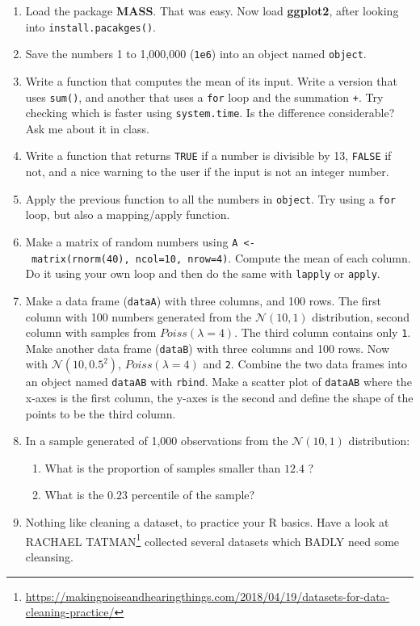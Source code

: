 \documentclass[]{book}
\providecommand{\tightlist}{%
  \setlength{\itemsep}{0pt}\setlength{\parskip}{0pt}}
\renewcommand{\href}[2]{#2\footnote{\url{#1}}}
\theoremstyle{definition}
\theoremstyle{definition}
\theoremstyle{definition}
\theoremstyle{remark}
\begin{document}
\begin{enumerate}
\def\labelenumi{\arabic{enumi}.}
\item
  Load the package \textbf{MASS}. That was easy. Now load \textbf{ggplot2}, after looking into \texttt{install.pacakges()}.
\item
  Save the numbers 1 to 1,000,000 (\texttt{1e6}) into an object named \texttt{object}.
\item
  Write a function that computes the mean of its input.
  Write a version that uses \texttt{sum()}, and another that uses a \texttt{for} loop and the summation \texttt{+}.
  Try checking which is faster using \texttt{system.time}.
  Is the difference considerable? Ask me about it in class.
\item
  Write a function that returns \texttt{TRUE} if a number is divisible by 13, \texttt{FALSE} if not, and a nice warning to the user if the input is not an integer number.
\item
  Apply the previous function to all the numbers in \texttt{object}. Try using a \texttt{for} loop, but also a mapping/apply function.
\item
  Make a matrix of random numbers using \texttt{A\ \textless{}-\ matrix(rnorm(40),\ ncol=10,\ nrow=4)}.
  Compute the mean of each column.
  Do it using your own loop and then do the same with \texttt{lapply} or \texttt{apply}.
\item
  Make a data frame (\texttt{dataA}) with three columns, and 100 rows.
  The first column with 100 numbers generated from the \(\mathcal{N}(10,1)\) distribution, second column with samples from \(Poiss(\lambda=4)\).
  The third column contains only \texttt{1}.\\
  Make another data frame (\texttt{dataB}) with three columns and 100 rows.
  Now with \(\mathcal{N}(10,0.5^2)\), \(Poiss(\lambda=4)\) and \texttt{2}.
  Combine the two data frames into an object named \texttt{dataAB} with \texttt{rbind}.
  Make a scatter plot of \texttt{dataAB} where the x-axes is the first column, the y-axes is the second and define the shape of the points to be the third column.
\item
  In a sample generated of 1,000 observations from the \(\mathcal{N}(10,1)\) distribution:

  \begin{enumerate}
  \def\labelenumii{\arabic{enumii}.}
  \tightlist
  \item
    What is the proportion of samples smaller than \(12.4\) ?
  \item
    What is the \(0.23\) percentile of the sample?
  \end{enumerate}
\item
  Nothing like cleaning a dataset, to practice your R basics. Have a look at \href{https://makingnoiseandhearingthings.com/2018/04/19/datasets-for-data-cleaning-practice/}{RACHAEL TATMAN} collected several datasets which BADLY need some cleansing.
\end{enumerate}
\end{document}
